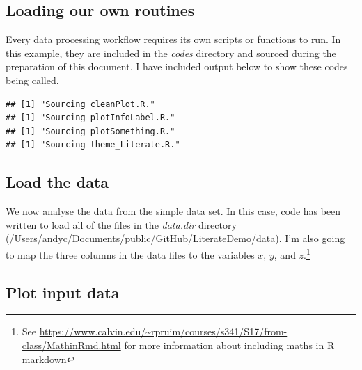 \documentclass[10pt,]{article}
\newenvironment{Shaded}{\begin{snugshade}}{\end{snugshade}}
\newcommand{\CharTok}[1]{\textcolor[rgb]{0.31,0.60,0.02}{#1}}
\newcommand{\CommentTok}[1]{\textcolor[rgb]{0.56,0.35,0.01}{\textit{#1}}}
\newcommand{\ControlFlowTok}[1]{\textcolor[rgb]{0.13,0.29,0.53}{\textbf{#1}}}
\newcommand{\DataTypeTok}[1]{\textcolor[rgb]{0.13,0.29,0.53}{#1}}
\newcommand{\KeywordTok}[1]{\textcolor[rgb]{0.13,0.29,0.53}{\textbf{#1}}}
\newcommand{\NormalTok}[1]{#1}
\newcommand{\StringTok}[1]{\textcolor[rgb]{0.31,0.60,0.02}{#1}}
\let\rmarkdownfootnote\footnote%
\def\footnote{\protect\rmarkdownfootnote}
\begin{document}
\hypertarget{loading-our-own-routines}{%
\subsection{Loading our own routines}\label{loading-our-own-routines}}

Every data processing workflow requires its own scripts or functions to run. In this example, they are included in the \emph{codes} directory and sourced during the preparation of this document. I have included output below to show these codes being called.

\begin{Shaded}
\end{Shaded}

\begin{verbatim}
## [1] "Sourcing cleanPlot.R."
## [1] "Sourcing plotInfoLabel.R."
## [1] "Sourcing plotSomething.R."
## [1] "Sourcing theme_Literate.R."
\end{verbatim}

\hypertarget{load-the-data}{%
\subsection{Load the data}\label{load-the-data}}

We now analyse the data from the simple data set. In this case, code has been written to load all of the files in the \emph{data.dir} directory (/Users/andyc/Documents/public/GitHub/LiterateDemo/data). I'm also going to map the three columns in the data files to the variables \(x\), \(y\), and \(z\).\footnote{See \url{https://www.calvin.edu/~rpruim/courses/s341/S17/from-class/MathinRmd.html} for more information about including maths in R markdown}

\hypertarget{plot-input-data}{%
\subsection{Plot input data}\label{plot-input-data}}
\end{document}
